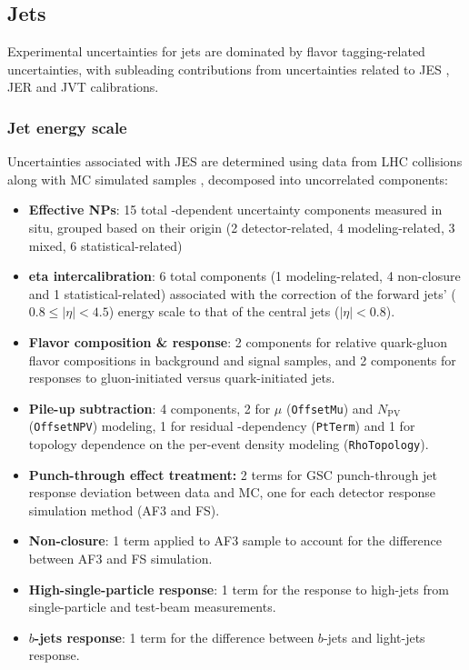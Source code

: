 \documentclass[../thesis.tex]{subfiles}
\begin{document}
\subsection{Jets}
Experimental uncertainties for jets are dominated by flavor tagging-related uncertainties, with subleading contributions from uncertainties related to \acs{JES} \citep{reco:jet_jes}, \acs{JER} \citep{reco:jet_jer} and \acs{JVT} \citep{syst:jvt_calib} calibrations. 


\subsubsection*{Jet energy scale}
Uncertainties associated with \acs{JES} are determined using data from \acs{LHC} collisions along with \acs{MC} simulated samples \citep{reco:jet_jes}, decomposed into uncorrelated components:
\begin{itemize}
\item \textbf{Effective \acs{NP}s}: 15 total \pT-dependent uncertainty components measured in situ, grouped based on their origin (2 detector-related, 4 modeling-related, 3 mixed, 6 statistical-related)
\item \textbf{\acs{eta} intercalibration}: 6 total components (1 modeling-related, 4 non-closure and 1 statistical-related) associated with the correction of the forward jets' ($0.8\leq |\eta| < 4.5$) energy scale to that of the central jets ($|\eta| < 0.8$).
\item \textbf{Flavor composition \& response}: 2 components for relative quark-gluon flavor compositions in background and signal samples, and 2 components for responses to gluon-initiated versus quark-initiated jets.
\item \textbf{Pile-up subtraction}: 4 components, 2 for $\mu$ (\verb|OffsetMu|) and $N_\mathrm{PV}$ (\verb|OffsetNPV|) modeling, 1 for residual \pT-dependency (\verb|PtTerm|) and 1 for topology dependence on the per-event \pT density modeling (\verb|RhoTopology|).
\item \textbf{Punch-through effect treatment:} 2 terms for \acs{GSC} punch-through jet response deviation between data and \acs{MC}, one for each detector response simulation method (\acs{AF3} and \acs{FS}).
\item \textbf{Non-closure}: 1 term applied to \acs{AF3} sample to account for the difference between \acs{AF3} and \acs{FS} simulation.
\item \textbf{High-\pT single-particle response}: 1 term for the response to high-\pT jets from single-particle and test-beam measurements.
\item \textbf{$b$-jets response}: 1 term for the difference between $b$-jets and light-jets response.
\end{itemize}
\end{document}
